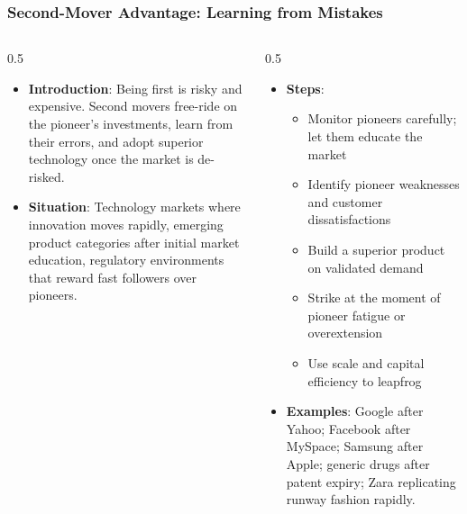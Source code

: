 \begin{frame}[fragile]\frametitle{Second-Mover Advantage: Learning from Mistakes}
\begin{columns}
    \begin{column}[T]{0.5\linewidth}
      \begin{itemize}
        \item \textbf{Introduction}: Being first is risky and expensive. Second movers free-ride on the pioneer's investments, learn from their errors, and adopt superior technology once the market is de-risked.
        \item \textbf{Situation}: Technology markets where innovation moves rapidly, emerging product categories after initial market education, regulatory environments that reward fast followers over pioneers.
      \end{itemize}
    \end{column}
    \begin{column}[T]{0.5\linewidth}
      \begin{itemize}
        \item \textbf{Steps}:
        \begin{itemize}
          \item Monitor pioneers carefully; let them educate the market
          \item Identify pioneer weaknesses and customer dissatisfactions
          \item Build a superior product on validated demand
          \item Strike at the moment of pioneer fatigue or overextension
          \item Use scale and capital efficiency to leapfrog
        \end{itemize}\item \textbf{Examples}: Google after Yahoo; Facebook after MySpace; Samsung after Apple; generic drugs after patent expiry; Zara replicating runway fashion rapidly.
      \end{itemize}
    \end{column}
  \end{columns}
\end{frame}

